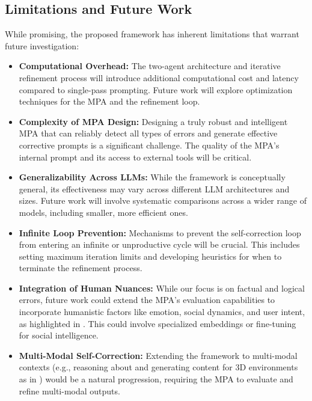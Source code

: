 \documentclass{article}
\begin{document}
\subsection{Limitations and Future Work}
While promising, the proposed framework has inherent limitations that warrant future investigation:
\begin{itemize}
    \item \textbf{Computational Overhead:} The two-agent architecture and iterative refinement process will introduce additional computational cost and latency compared to single-pass prompting. Future work will explore optimization techniques for the MPA and the refinement loop.
    \item \textbf{Complexity of MPA Design:} Designing a truly robust and intelligent MPA that can reliably detect all types of errors and generate effective corrective prompts is a significant challenge. The quality of the MPA's internal prompt and its access to external tools will be critical.
    \item \textbf{Generalizability Across LLMs:} While the framework is conceptually general, its effectiveness may vary across different LLM architectures and sizes. Future work will involve systematic comparisons across a wider range of models, including smaller, more efficient ones.
    \item \textbf{Infinite Loop Prevention:} Mechanisms to prevent the self-correction loop from entering an infinite or unproductive cycle will be crucial. This includes setting maximum iteration limits and developing heuristics for when to terminate the refinement process.
    \item \textbf{Integration of Human Nuances:} While our focus is on factual and logical errors, future work could extend the MPA's evaluation capabilities to incorporate humanistic factors like emotion, social dynamics, and user intent, as highlighted in \cite{P2}. This could involve specialized embeddings or fine-tuning for social intelligence.
    \item \textbf{Multi-Modal Self-Correction:} Extending the framework to multi-modal contexts (e.g., reasoning about and generating content for 3D environments as in \cite{P4}) would be a natural progression, requiring the MPA to evaluate and refine multi-modal outputs.
\end{itemize}
\end{document}
